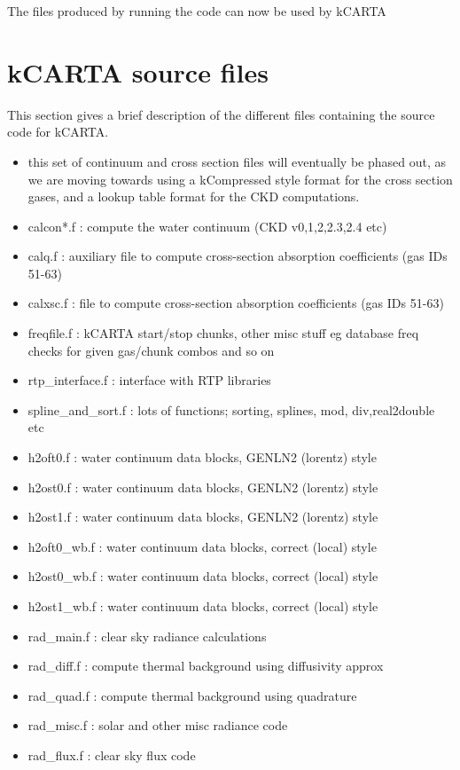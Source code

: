 \documentclass[12pt]{article}
\newcommand{\kc}{\textsf{kCARTA}\xspace}
\begin{document}
The files produced by running the code can now be used by \kc

\section{\kc source files}
This section gives a brief description of the different files containing the
source code for \kc.

\begin{itemize}
\item this set of continuum and cross section files will eventually be phased
out, as we are moving towards using a kCompressed style format for the 
cross section gases, and a lookup table format for the CKD computations.
\item {\sf calcon*.f} : compute the water continuum (CKD v0,1,2,2.3,2.4 etc)
\item {\sf calq.f}    : auxiliary file to compute cross-section absorption 
                        coefficients (gas IDs 51-63)
\item {\sf calxsc.f}  : file to compute cross-section absorption 
                        coefficients (gas IDs 51-63)

\item {\sf freqfile.f}        : kCARTA start/stop chunks, other misc stuff
                                eg database freq checks for given gas/chunk
                                combos and so on
\item {\sf rtp\_interface.f}   : interface with RTP libraries
\item {\sf spline\_and\_sort.f} : lots of functions; sorting, splines, mod, 
                                  div,real2double etc

\item {\sf h2oft0.f} : water continuum data blocks, GENLN2 (lorentz) style
\item {\sf h2ost0.f} : water continuum data blocks, GENLN2 (lorentz) style
\item {\sf h2ost1.f} : water continuum data blocks, GENLN2 (lorentz) style
\item {\sf h2oft0\_wb.f} : water continuum data blocks, correct (local) style
\item {\sf h2ost0\_wb.f} : water continuum data blocks, correct (local) style
\item {\sf h2ost1\_wb.f} : water continuum data blocks, correct (local) style

\item {\sf rad\_main.f} : clear sky radiance calculations
\item {\sf rad\_diff.f} : compute thermal background using diffusivity approx
\item {\sf rad\_quad.f} : compute thermal background using quadrature
\item {\sf rad\_misc.f} : solar and other misc radiance code
\item {\sf rad\_flux.f} : clear sky flux code


\end{itemize}
\end{document}
